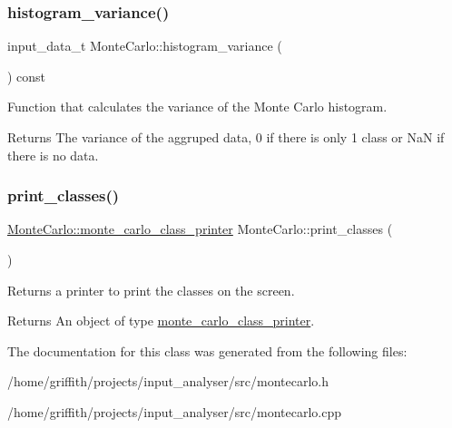 \subsubsection{\texorpdfstring{histogram\+\_\+variance()}{histogram\_variance()}}
{\footnotesize\ttfamily input\+\_\+data\+\_\+t Monte\+Carlo\+::histogram\+\_\+variance (\begin{DoxyParamCaption}{ }\end{DoxyParamCaption}) const}

Function that calculates the variance of the Monte Carlo histogram. \begin{DoxyReturn}{Returns}
The variance of the aggruped data, 0 if there is only 1 class or NaN if there is no data. 
\end{DoxyReturn}
\mbox{\label{classMonteCarlo_a736ca6442900d47116bc040c284ac69f}} 
\subsubsection{\texorpdfstring{print\+\_\+classes()}{print\_classes()}}
{\footnotesize\ttfamily \hyperlink{structMonteCarlo_1_1monte__carlo__class__printer}{Monte\+Carlo\+::monte\+\_\+carlo\+\_\+class\+\_\+printer} Monte\+Carlo\+::print\+\_\+classes (\begin{DoxyParamCaption}{ }\end{DoxyParamCaption})}

Returns a printer to print the classes on the screen. \begin{DoxyReturn}{Returns}
An object of type \hyperlink{structMonteCarlo_1_1monte__carlo__class__printer}{monte\+\_\+carlo\+\_\+class\+\_\+printer}. 
\end{DoxyReturn}


The documentation for this class was generated from the following files\+:\begin{DoxyCompactItemize}
\item 
/home/griffith/projects/input\+\_\+analyser/src/montecarlo.\+h\item 
/home/griffith/projects/input\+\_\+analyser/src/montecarlo.\+cpp\end{DoxyCompactItemize}
